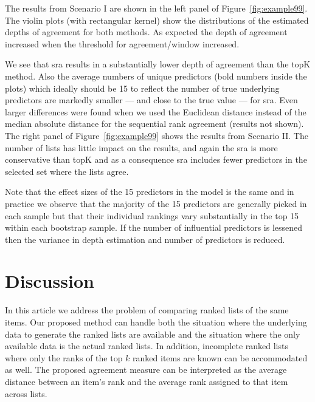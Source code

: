 \documentclass[oupdraft]{bio}
\newcommand{\added}[1]{{\color{added}{}#1}}
\begin{document}
The results from Scenario I are shown in the left panel of
Figure~\ref{fig:example99}. The violin plots (with rectangular kernel)
show the distributions of the estimated depths of agreement for both
methods. As expected the depth of agreement increased when the
threshold for agreement/window increased.

\added{
We see that sra results in a substantially lower depth of agreement
than the topK method. Also the average numbers of unique predictors
(bold numbers inside the plots) \added{which ideally should be 15 to
  reflect the number of true underlying predictors} are markedly
smaller --- and close to the true value --- for sra. Even larger
differences were found when we used the Euclidean distance instead of
the median absolute distance for the sequential rank agreement
(results not shown).  The right panel of Figure~\ref{fig:example99}
shows the results from Scenario II. The number of lists has little
impact on the results, and again the sra is more conservative than
topK and as a consequence sra includes fewer predictors in the
selected set where the lists agree.

Note that the effect sizes of the 15 predictors in the model is the
same and in practice we observe that the majority of the 15 predictors
are generally picked in each sample but that their individual rankings
vary substantially in the top 15 within each bootstrap sample. If the
number of influential predictors is lessened then the variance in
depth estimation and number of predictors is reduced.}
 
\section{Discussion}
In this article we address the problem of comparing ranked lists of
the same items. Our proposed method can handle both the situation
where the underlying data to generate the ranked lists are available
and the situation where the only available data is the actual ranked
lists. In addition, incomplete ranked lists where only the ranks of the
top $k$ ranked items are known can be accommodated as well. The
proposed agreement measure can be interpreted as the average distance
between an item's rank and the average rank assigned to that item
across lists.
\end{document}
